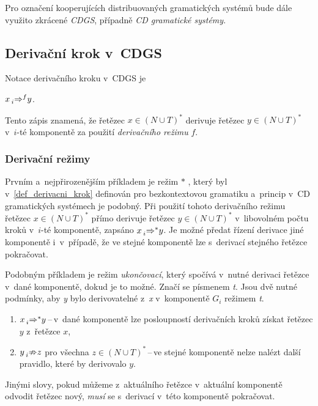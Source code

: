 \begin{convention}
    Pro označení kooperujících distribuovaných gramatických systémů bude dále využito zkrácené \emph{CDGS}, případně \emph{CD gramatické systémy}.
\end{convention}

\subsection*{Derivační krok v~CDGS}
Notace derivačního kroku v~CDGS je
\begin{center}
    $x \prescript{}{i}{\Rightarrow}^{f} y$.
\end{center}
Tento zápis znamená, že řetězec $x \in (N \cup T)^{*}$ derivuje řetězec $y \in (N \cup T)^{*}$ v~$i$-té komponentě za použití \emph{derivačního režimu} $f$.

\subsubsection*{Derivační režimy}

Prvním a~nejpřirozenějším příkladem je režim $*$ , který byl v~\ref{def_derivacni_krok} definován pro bezkontextovou gramatiku a~princip v~CD gramatických systémech je podobný.
Při použití tohoto derivačního režimu řetězec $x \in (N \cup T)^*$ přímo derivuje řetězec $y \in (N \cup T)^*$ v~libovolném počtu kroků v~$i$-té komponentě, zapsáno $x \prescript{}{i}{\Rightarrow}^{*}y$.
Je možné předat řízení derivace jiné komponentě i~v~případě, že ve stejné komponentě lze s~derivací stejného řetězce pokračovat.

Podobným příkladem je režim \emph{ukončovací}, který spočívá v~nutné derivaci řetězce v~dané komponentě, dokud je to možné. Značí se písmenem \emph{t}. Jsou dvě nutné podmínky, aby \emph{y} bylo derivovatelné z~\emph{x} v~komponentě $G_i$ režimem \emph{t}.
\begin{enumerate}
    \item $x \prescript{}{i}{\Rightarrow}^{*} y$\,--\,v~dané komponentě lze posloupností derivačních kroků získat řetězec $y$ z~řetězce $x$,
    \item $y \prescript{}{i}{\nRightarrow} z$ pro všechna $z \in (N \cup T)^{*}$\,--\,ve stejné komponentě nelze nalézt další pravidlo, které by derivovalo $y$.
\end{enumerate}
Jinými slovy, pokud můžeme z~aktuálního řetězce v~aktuální komponentě odvodit řetězec nový, \emph{musí} se s~derivací v~této komponentě pokračovat. 

